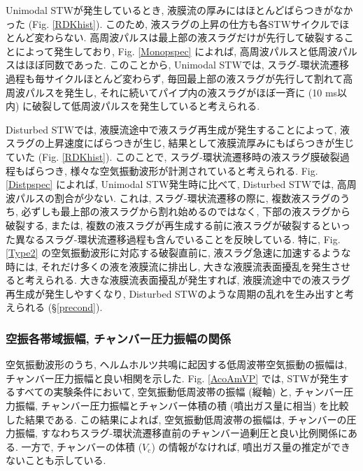\documentclass[12pt]{article}
\begin{document}
Unimodal STWが発生しているとき, 液膜流の厚みにはほとんどばらつきがなかった (Fig. \ref{RDKhist}). このため, 液スラグの上昇の仕方も各STWサイクルでほとんど変わらない. 高周波パルスは最上部の液スラグだけが先行して破裂することによって発生しており, Fig. \ref{Monopspec} によれば, 高周波パルスと低周波パルスはほぼ同数であった. このことから, Unimodal STWでは, スラグ-環状流遷移過程も毎サイクルほとんど変わらず, 毎回最上部の液スラグが先行して割れて高周波パルスを発生し, それに続いてパイプ内の液スラグがほぼ一斉に (10 ms以内) に破裂して低周波パルスを発生していると考えられる.

Disturbed STWでは, 液膜流途中で液スラグ再生成が発生することによって, 液スラグの上昇速度にばらつきが生じ, 結果として液膜流厚みにもばらつきが生じていた (Fig. \ref{RDKhist}). このことで, スラグ-環状流遷移時の液スラグ膜破裂過程もばらつき, 様々な空気振動波形が計測されていると考えられる. Fig. \ref{Distpspec} によれば, Unimodal STW発生時に比べて, Disturbed STWでは, 高周波パルスの割合が少ない. これは, スラグ-環状流遷移の際に, 複数液スラグのうち, 必ずしも最上部の液スラグから割れ始めるのではなく, 下部の液スラグから破裂する, または, 複数の液スラグが再生成する前に液スラグが破裂するといった異なるスラグ-環状流遷移過程も含んでいることを反映している.
特に, Fig. \ref{Type2} の空気振動波形に対応する破裂直前に, 液スラグ急速に加速するような時には, それだけ多くの液を液膜流に排出し, 大きな液膜流表面擾乱を発生させると考えられる. 大きな液膜流表面擾乱が発生すれば, 液膜流途中での液スラグ再生成が発生しやすくなり, Disturbed STWのような周期の乱れを生み出すと考えられる (\S \ref{precond}). 


\subsubsection{空振各帯域振幅, チャンバー圧力振幅の関係}


空気振動波形のうち, ヘルムホルツ共鳴に起因する低周波帯空気振動の振幅は, チャンバー圧力振幅と良い相関を示した. Fig. \ref{AcoAmVP} では, STWが発生するすべての実験条件において, 空気振動低周波帯の振幅 (縦軸) と, チャンバー圧力振幅, チャンバー圧力振幅とチャンバー体積の積 (噴出ガス量に相当) を比較した結果である. この結果によれば, 空気振動低周波帯の振幅は, チャンバーの圧力振幅, すなわちスラグ-環状流遷移直前のチャンバー過剰圧と良い比例関係にある. 一方で, チャンバーの体積 ($V_\mathrm{c}$) の情報がなければ, 噴出ガス量の推定ができないことも示している. 
\end{document}
